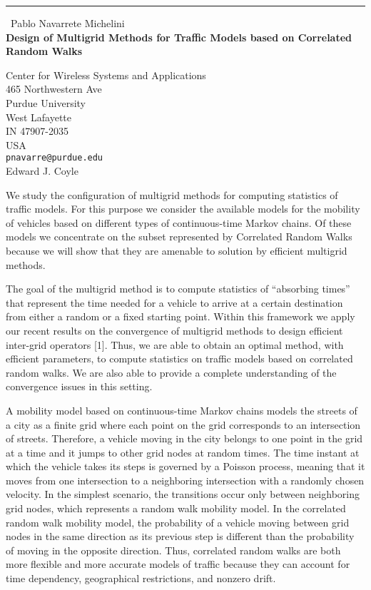 \documentclass{report}
\begin{document}
\begin{center}
\rule{6in}{1pt} \
{\large Pablo Navarrete Michelini \\
{\bf Design of Multigrid Methods for Traffic Models based on Correlated Random Walks}}

Center for Wireless Systems and Applications \\ 465 Northwestern Ave  \\ Purdue University \\ West Lafayette \\ IN 47907-2035 \\ USA
\\
{\tt pnavarre@purdue.edu}\\
Edward J. Coyle\end{center}

We study the configuration of multigrid methods for computing statistics
of traffic models. For this purpose we consider the available models for
the mobility of vehicles based on different types of continuous-time
Markov chains. Of these models we concentrate on the subset represented
by Correlated Random Walks because we will show that they are amenable to
solution by efficient multigrid methods.

The goal of the multigrid method is to compute statistics of ``absorbing
times'' that represent the time needed for a vehicle to arrive at a
certain destination from either a random or a fixed starting point.
Within this framework we apply our recent results on the convergence of
multigrid methods to design efficient inter-grid operators [1]. Thus, we
are able to obtain an optimal method, with efficient parameters, to
compute statistics on traffic models based on correlated random walks. We
are also able to provide a complete understanding of the convergence
issues in this setting.

A mobility model based on continuous-time Markov chains models the
streets of a city as a finite grid where each point on the grid
corresponds to an intersection of streets. Therefore, a vehicle moving in
the city belongs to one point in the grid at a time and it jumps to other
grid nodes at random times. The time instant at which the vehicle takes
its steps is governed by a Poisson process, meaning that it moves from
one intersection to a neighboring intersection with a randomly chosen
velocity. In the simplest scenario, the transitions occur only between
neighboring grid nodes, which represents a random walk mobility model. In
the correlated random walk mobility model, the probability of a vehicle
moving between grid nodes in the same direction as its previous step is
different than the probability of moving in the opposite direction. Thus,
correlated random walks are both more flexible and more accurate models
of traffic because they can account for time dependency, geographical
restrictions, and nonzero drift.
\end{document}
